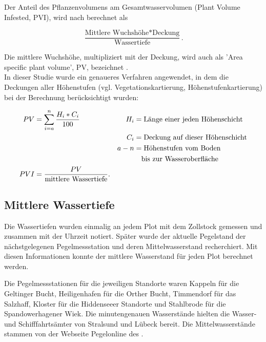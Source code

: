 Der Anteil des Pflanzenvolumens am Gesamtwasservolumen (Plant Volume Infested, PVI), wird nach \cite{jeppesen_1998, schriver_1995, canfield_1984} berechnet als 

\begin{equation*}
\frac{\text{Mittlere Wuchshöhe} * \text{Deckung}}{\text{Wassertiefe}}.
\end{equation*}

Die mittlere Wuchshöhe, multipliziert mit der Deckung, wird auch als 'Area specific plant volume', PV, bezeichnet \citep{jeppesen_1998}.\\
In dieser Studie wurde ein genaueres Verfahren angewendet, in dem die Deckungen aller Höhenstufen (vgl. Vegetationskartierung, Höhenstufenkartierung) bei der Berechnung berücksichtigt wurden:


\begin{align*}
 PV &=\sum_{i=a}^n \frac{H_i * C_i}{100} & H_i &=\text{Länge einer jeden Höhenschicht}\\ 
 & & C_i &=\text{Deckung auf dieser Höhenschicht}\\
 & & a-n &=\text{Höhenstufen vom Boden}\\
 & &     &\text{\quad bis zur Wasseroberfläche}\\
 PVI &=\frac{PV}{\text{mittlere Wassertiefe}}.\\
\end{align*}



\subsection {Mittlere Wassertiefe}

Die Wassertiefen wurden einmalig an jedem Plot mit dem Zollstock gemessen und zusammen mit der Uhrzeit notiert. Später wurde der aktuelle Pegelstand der nächstgelegenen Pegelmessstation und deren Mittelwasserstand recherchiert. Mit diesen Informationen konnte der mittlere Wasserstand für jeden Plot berechnet werden.

Die Pegelmessstationen für die jeweiligen Standorte waren Kappeln für die Geltinger Bucht, Heiligenhafen für die Orther Bucht, Timmendorf für das Salzhaff, Kloster für die Hiddenseeer Standorte und Stahlbrode für die Spandowerhagener Wiek. Die minutengenauen Wasserstände hielten die Wasser- und Schifffahrtsämter von Stralsund und Lübeck bereit. Die Mittelwasserstände stammen von der Webseite Pegelonline des \cite{wasser-_und_schifffahrtsverwaltung_des_bundes_2013}.



